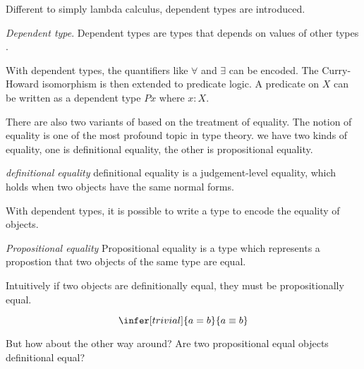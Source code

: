 
Different to simply lambda calculus, dependent types are introduced.

\begin{definition}\label{dpty}
\textit{Dependent type}. Dependent types are types that depends on values of other types \cite{dtw}. 
\end{definition}

With dependent types, the quantifiers like $\forall$ and $\exists$ can be encoded.
The Curry-Howard isomorphism is then extended to predicate logic. 
A predicate on $X$ can be written as a dependent type $P x$ where $x : X$. 

There are also two variants of \mltt based on the treatment of equality.
The notion of equality is one of the most profound topic in type theory.
we have two kinds of equality, one is definitional equality, the other is propositional equality.

\begin{definition}
\textit{definitional equality} definitional equality is a judgement-level equality, which holds when two objects have the same normal forms\cite{nor:90}.
\end{definition}



With dependent types, it is possible to write a type to encode the equality of objects.

\begin{definition}
\textit{Propositional equality} Propositional equality is a type which represents a propostion that two objects of the same type are equal.
\end{definition}

Intuitively if two objects are definitionally equal, they must be propositionally equal.

\begin{equation*}
\infer[trivial]{a = b}{a \equiv b}
\end{equation*}

But how about the other way around? Are two propositional equal objects definitional equal?


